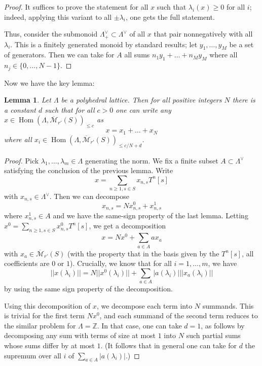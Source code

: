 \documentclass[11pt]{amsbook}
\DeclareMathOperator{\Hom}{Hom}
\numberwithin{equation}{section}
\numberwithin{theorem}{section}
\newtheorem{lemma}[theorem]{Lemma}
\theoremstyle{definition}
\begin{document}
\begin{proof} It suffices to prove the statement for all $x$ such that $\lambda_i(x)\geq 0$ for all $i$; indeed, applying this variant to all $\pm \lambda_i$, one gets the full statement.

Thus, consider the submonoid $\Lambda^\vee_+\subset \Lambda^\vee$ of all $x$ that pair nonnegatively with all $\lambda_i$. This is a finitely generated monoid by standard results; let $y_1,\ldots,y_M$ be a set of generators. Then we can take for $A$ all sums $n_1y_1+\ldots+n_My_M$ where all $n_j\in \{0,\ldots,N-1\}$.
\end{proof}

Now we have the key lemma:

\begin{lemma}\label{lem:key} Let $\Lambda$ be a polyhedral lattice. Then for all positive integers $N$ there is a constant $d$ such that for all $c>0$ one can write any $x\in \Hom(\Lambda,\overline{\mathcal M}_{r'}(S))_{\leq c}$ as
\[
x=x_1+\ldots+x_N
\]
where all $x_i\in \Hom(\Lambda,\overline{\mathcal M}_{r'}(S))_{\leq c/N+d}$.
\end{lemma}

\begin{proof} Pick $\lambda_1,\ldots,\lambda_m\in \Lambda$ generating the norm. We fix a finite subset $A\subset \Lambda^\vee$ satisfying the conclusion of the previous lemma. Write
\[
x=\sum_{n\geq 1, s\in S} x_{n,s} T^n [s]
\]
with $x_{n,s}\in \Lambda^\vee$. Then we can decompose
\[
x_{n,s} = N x_{n,s}^0 + x_{n,s}^1
\]
where $x_{n,s}^1\in A$ and we have the same-sign property of the last lemma. Letting $x^0 = \sum_{n\geq 1, s\in S} x_{n,s}^0 T^n [s]$, we get a decomposition
\[
x = Nx^0 + \sum_{a\in A} a x_a
\]
with $x_a\in \overline{\mathcal M}_{r'}(S)$ (with the property that in the
basis given by the $T^n [s]$, all coefficients are $0$ or $1$). Crucially,
we know that for all $i=1,\ldots,m$, we have
\[
||x(\lambda_i)|| = N ||x^0(\lambda_i)|| + \sum_{a\in A} |a(\lambda_i)| ||x_a(\lambda_i)||
\]
by using the same sign property of the decomposition.

Using this decomposition of $x$, we decompose each term into $N$ summands. This is trivial for the first term $Nx^0$, and each summand of the second term reduces to the similar problem for $\Lambda=\mathbb Z$. In that case, one can take $d=1$, as follows by decomposing any sum with terms of size at most $1$ into $N$ such partial sums whose sums differ by at most $1$. (It follows that in general one can take for $d$ the supremum over all $i$ of $\sum_{a\in A} |a(\lambda_i)|$.)
\end{proof}
\end{document}
